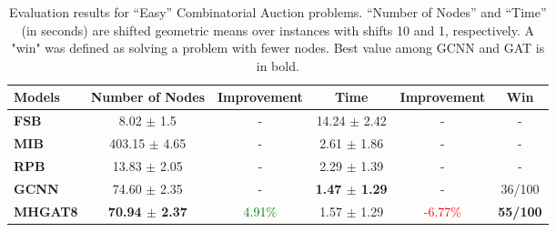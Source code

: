 \begin{table*}[htb!]
    \centering
    \begin{tabular}{|l c c c c c|}
        \hline
        \textbf{Models} & \textbf{Number of Nodes} & \textbf{Improvement} & \textbf{Time} & \textbf{Improvement} & \textbf{Win}\\
        \hline
        \textbf{FSB} & 8.02 $\pm$ 1.5 & - & 14.24 $\pm$ 2.42 & - & -\\
        \textbf{MIB} & 403.15 $\pm$ 4.65 & - & 2.61 $\pm$ 1.86 & - & -\\
        \textbf{RPB} & 13.83 $\pm$ 2.05 & - & 2.29 $\pm$ 1.39 & - & -\\
        \hline
        \textbf{GCNN} & 74.60 $\pm$ 2.35 & - & \textbf{1.47 $\pm$ 1.29} & - & 36/100\\
        \textbf{MHGAT8} & \textbf{70.94 $\pm$ 2.37} & \textcolor{green}{4.91\%} & 1.57 $\pm$ 1.29 & \textcolor{red}{-6.77\%} & \textbf{55/100}\\
        \hline
    \end{tabular}
    \caption{Evaluation results for “Easy” Combinatorial Auction problems. “Number of Nodes” and “Time” (in seconds) are shifted geometric means over instances with shifts 10 and 1, respectively.
    A "win" was defined as solving a problem with fewer nodes.
    Best value among GCNN and GAT is in bold.}
    \label{tab:ca-results-easy}
\end{table*}